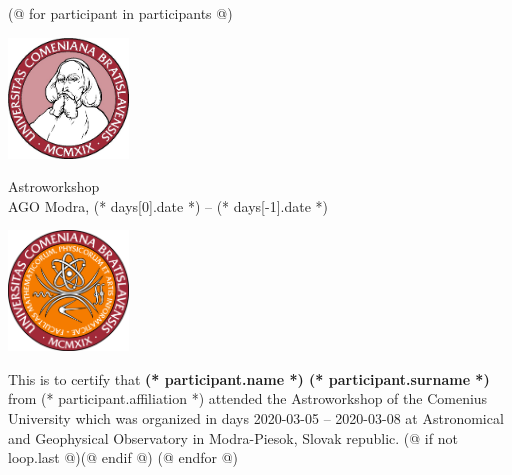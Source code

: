 \documentclass[a4paper]{report}
\begin{document}
    (@ for participant in participants @)
        \begin{minipage}{\textwidth}
            \begin{minipage}{0.2\textwidth}
                \includegraphics[width=32mm]{pictures/logo.jpg}
            \end{minipage}
            \begin{minipage}{0.58\textwidth}
                \centering
                \fontsize{40}{50}\selectfont
                Astroworkshop\\
                \Large
                AGO Modra, (* days[0].date *) -- (* days[-1].date *)
            \end{minipage}
            \begin{minipage}{0.2\textwidth}
                \includegraphics[width=32mm]{pictures/fmfi.png}
            \end{minipage}
        \end{minipage}
        \vspace*{10mm}

        This is to certify that \textbf{(* participant.name *) (* participant.surname *)} from (* participant.affiliation *)
        attended the Astroworkshop of the Comenius University
        which was organized in days 2020-03-05 -- 2020-03-08
        at Astronomical and Geophysical Observatory in Modra-Piesok, Slovak republic.
        (@ if not loop.last @)\newpage(@ endif @)
    (@ endfor @)
\end{document}
